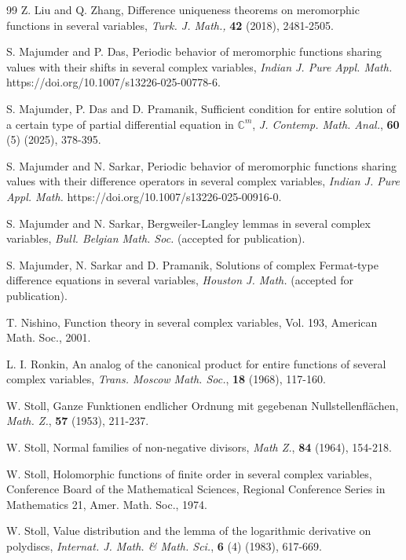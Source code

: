 \documentclass[11pt,reqno]{amsart}
\numberwithin{equation}{section}
\begin{document}
\begin{thebibliography}{99}
 {\sc Z. Liu} and {\sc Q. Zhang}, Difference uniqueness theorems on meromorphic functions in several variables, \textit{Turk. J. Math.,} \textbf{42} (2018), 2481-2505.

 {\sc S. Majumder} and {\sc P. Das}, Periodic behavior of meromorphic functions sharing values with their shifts in several complex variables, \textit{Indian J. Pure Appl. Math.} https://doi.org/10.1007/s13226-025-00778-6.

 {\sc S. Majumder}, {\sc P. Das} and {\sc D. Pramanik}, Sufficient condition for entire solution of a certain type of partial differential equation in $\mathbb{C}^m$, \textit{J. Contemp. Math. Anal.}, \textbf{60} (5) (2025), 378-395.

 {\sc S. Majumder} and {\sc N. Sarkar}, Periodic behavior of meromorphic functions sharing values with their difference operators in several complex variables, \textit{Indian J. Pure Appl. Math.} https://doi.org/10.1007/s13226-025-00916-0.

 {\sc S. Majumder} and {\sc N. Sarkar}, Bergweiler-Langley lemmas in several complex variables, 
\textit{Bull. Belgian Math. Soc.} (accepted for publication).

 {\sc S. Majumder}, {\sc N. Sarkar} and {\sc D. Pramanik}, Solutions of complex Fermat-type difference equations in several variables, \textit{Houston J. Math.} (accepted for publication).


 {\sc T. Nishino}, Function theory in several complex variables, Vol. 193, American Math. Soc., 2001.

 {\sc L. I. Ronkin}, An analog of the canonical product for entire functions of several complex variables, \textit{Trans. Moscow Math. Soc.}, \textbf{18} (1968), 117-160.

 {\sc W. Stoll}, Ganze Funktionen endlicher Ordnung mit gegebenan Nullstellenfl\"{a}chen, \textit{Math. Z.}, \textbf{57} (1953), 211-237.

 {\sc W. Stoll}, Normal families of non-negative divisors, \textit{Math Z.}, \textbf{84} (1964), 154-218.

 {\sc W. Stoll}, Holomorphic functions of finite order in several complex variables, Conference Board of the Mathematical Sciences, Regional Conference Series in Mathematics 21, Amer. Math. Soc., 1974.

 {\sc W. Stoll}, Value distribution and the lemma of the logarithmic derivative on polydiscs, \textit{Internat. J. Math. \& Math. Sci.}, \textbf{6} (4) (1983), 617-669.


\end{thebibliography}
\end{document}
